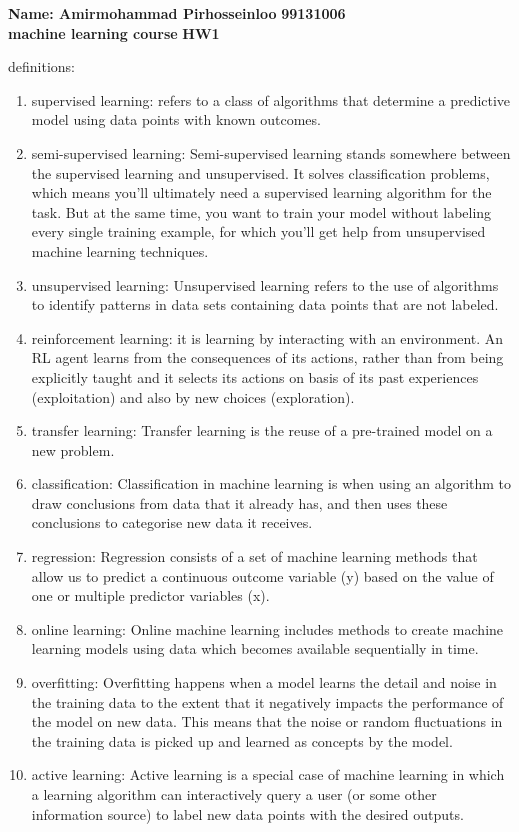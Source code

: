 \documentclass[11pt,letterpaper]{article}
\newcommand{\homework}[2]{\noindent\textbf{Name: Amirmohammad Pirhosseinloo}\makebox[3in]{\hrulefill} \hfill \textbf{99131006} \\  \textbf{machine learning course} \hfill \textbf{HW1}\\}
\newcounter{problem}
\begin{document}
\homework{\#}{MM/DD}


\begin{exercise}
definitions:
	\begin{enumerate}[(1)]
	\item supervised learning: refers to a class of algorithms that determine a predictive model using data points with known outcomes.
	\item semi-supervised learning: Semi-supervised learning stands somewhere between the supervised learning and unsupervised. It solves classification problems, which means you’ll ultimately need a supervised learning algorithm for the task. But at the same time, you want to train your model without labeling every single training example, for which you’ll get help from unsupervised machine learning techniques.
	\item unsupervised learning: Unsupervised learning refers to the use of algorithms to identify patterns in data sets containing data points that are not labeled.
	\item reinforcement learning: it is learning by interacting with an environment. An RL agent learns from the consequences of its actions, rather than from being explicitly taught and it selects its actions on basis of its past experiences (exploitation) and also by new choices (exploration).
	\item transfer learning: Transfer learning is the reuse of a pre-trained model on a new problem.
	\item classification: Classification in machine learning is when using an algorithm to draw conclusions from data that it already has, and then uses these conclusions to categorise new data it receives.
	\item regression: Regression consists of a set of machine learning methods that allow us to predict a continuous outcome variable (y) based on the value of one or multiple predictor variables (x).
	\item online learning: Online machine learning includes methods to create machine learning models using data which becomes available sequentially in time.
	\item overfitting: Overfitting happens when a model learns the detail and noise in the training data to the extent that it negatively impacts the performance of the model on new data. This means that the noise or random fluctuations in the training data is picked up and learned as concepts by the model.
	\item active learning: Active learning is a special case of machine learning in which a learning algorithm can interactively query a user (or some other information source) to label new data points with the desired outputs.

\end{enumerate}
\end{exercise}
\end{document}
